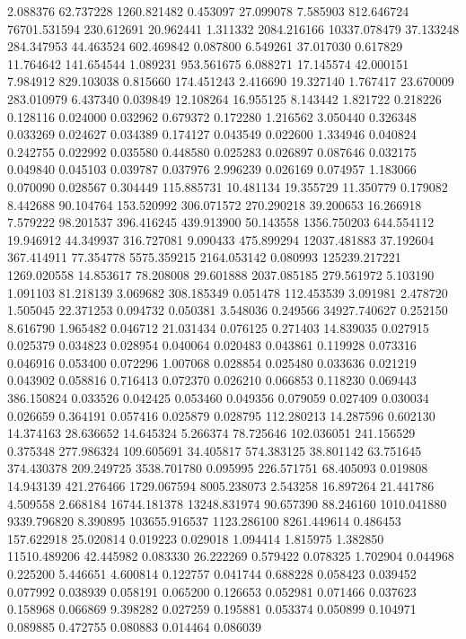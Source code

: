 2.088376
62.737228
1260.821482
0.453097
27.099078
7.585903
812.646724
76701.531594
230.612691
20.962441
1.311332
2084.216166
10337.078479
37.133248
284.347953
44.463524
602.469842
0.087800
6.549261
37.017030
0.617829
11.764642
141.654544
1.089231
953.561675
6.088271
17.145574
42.000151
7.984912
829.103038
0.815660
174.451243
2.416690
19.327140
1.767417
23.670009
283.010979
6.437340
0.039849
12.108264
16.955125
8.143442
1.821722
0.218226
0.128116
0.024000
0.032962
0.679372
0.172280
1.216562
3.050440
0.326348
0.033269
0.024627
0.034389
0.174127
0.043549
0.022600
1.334946
0.040824
0.242755
0.022992
0.035580
0.448580
0.025283
0.026897
0.087646
0.032175
0.049840
0.045103
0.039787
0.037976
2.996239
0.026169
0.074957
1.183066
0.070090
0.028567
0.304449
115.885731
10.481134
19.355729
11.350779
0.179082
8.442688
90.104764
153.520992
306.071572
270.290218
39.200653
16.266918
7.579222
98.201537
396.416245
439.913900
50.143558
1356.750203
644.554112
19.946912
44.349937
316.727081
9.090433
475.899294
12037.481883
37.192604
367.414911
77.354778
5575.359215
2164.053142
0.080993
125239.217221
1269.020558
14.853617
78.208008
29.601888
2037.085185
279.561972
5.103190
1.091103
81.218139
3.069682
308.185349
0.051478
112.453539
3.091981
2.478720
1.505045
22.371253
0.094732
0.050381
3.548036
0.249566
34927.740627
0.252150
8.616790
1.965482
0.046712
21.031434
0.076125
0.271403
14.839035
0.027915
0.025379
0.034823
0.028954
0.040064
0.020483
0.043861
0.119928
0.073316
0.046916
0.053400
0.072296
1.007068
0.028854
0.025480
0.033636
0.021219
0.043902
0.058816
0.716413
0.072370
0.026210
0.066853
0.118230
0.069443
386.150824
0.033526
0.042425
0.053460
0.049356
0.079059
0.027409
0.030034
0.026659
0.364191
0.057416
0.025879
0.028795
112.280213
14.287596
0.602130
14.374163
28.636652
14.645324
5.266374
78.725646
102.036051
241.156529
0.375348
277.986324
109.605691
34.405817
574.383125
38.801142
63.751645
374.430378
209.249725
3538.701780
0.095995
226.571751
68.405093
0.019808
14.943139
421.276466
1729.067594
8005.238073
2.543258
16.897264
21.441786
4.509558
2.668184
16744.181378
13248.831974
90.657390
88.246160
1010.041880
9339.796820
8.390895
103655.916537
1123.286100
8261.449614
0.486453
157.622918
25.020814
0.019223
0.029018
1.094414
1.815975
1.382850
11510.489206
42.445982
0.083330
26.222269
0.579422
0.078325
1.702904
0.044968
0.225200
5.446651
4.600814
0.122757
0.041744
0.688228
0.058423
0.039452
0.077992
0.038939
0.058191
0.065200
0.126653
0.052981
0.071466
0.037623
0.158968
0.066869
9.398282
0.027259
0.195881
0.053374
0.050899
0.104971
0.089885
0.472755
0.080883
0.014464
0.086039
